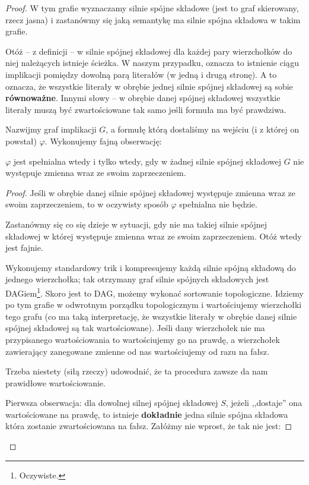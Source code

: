 \begin{proof}
	W tym grafie wyznaczamy silnie spójne składowe (jest to graf skierowany, rzecz jasna) i zastanówmy się jaką semantykę ma silnie spójna składowa w takim grafie.

	Otóż -- z definicji -- w silnie spójnej składowej dla każdej pary wierzchołków do niej należących istnieje ścieżka. W naszym przypadku, oznacza to istnienie ciągu implikacji pomiędzy dowolną parą literałów (w jedną i drugą stronę). A to oznacza, że wszystkie literały w obrębie jednej silnie spójnej składowej są sobie \textbf{równoważne}. Innymi słowy -- w obrębie danej spójnej składowej wszystkie literały muszą być zwartościowane tak samo jeśli formuła ma być prawdziwa.

	Nazwijmy graf implikacji \(G\), a formułę którą dostaliśmy na wejściu (i z której on powstał) \(\varphi\). Wykonujemy fajną obserwację:

	\begin{lemma}
		\(\varphi\) jest spełnialna wtedy i tylko wtedy, gdy w żadnej silnie spójnej składowej \(G\) nie występuje zmienna wraz ze swoim zaprzeczeniem.
	\end{lemma}
	\begin{proof}
		Jeśli w obrębie danej silnie spójnej składowej występuje zmienna wraz ze swoim zaprzeczeniem, to w oczywisty sposób \(\varphi\) spełnialna nie będzie.

		Zastanówmy się co się dzieje w sytuacji, gdy nie ma takiej silnie spójnej składowej w której występuje zmienna wraz ze swoim zaprzeczeniem. Otóż wtedy jest fajnie.

		Wykonujemy standardowy trik i kompresujemy każdą silnie spójną składową do jednego wierzchołka; tak otrzymany graf silnie spójnych składowych jest DAGiem\footnote{Oczywiste.}. Skoro jest to DAG, możemy wykonać sortowanie topologiczne. Idziemy po tym grafie w odwrotnym porządku topologicznym i wartościujemy wierzchołki tego grafu (co ma taką interpretację, że wszystkie literały w obrębie danej silnie spójnej składowej są tak wartościowane). Jeśli dany wierzchołek nie ma przypisanego wartościowania to wartościujemy go na prawdę, a wierzchołek zawierający zanegowane zmienne od nas wartościujemy od razu na fałsz.

		Trzeba niestety (siłą rzeczy) udowodnić, że ta procedura zawsze da nam prawidłowe wartościowanie.

		Pierwsza obserwacja: dla dowolnej silnej spójnej składowej \(S\), jeżeli ,,dostaje'' ona wartościowane na prawdę, to istnieje \textbf{dokładnie} jedna silnie spójna składowa która zostanie zwartościowana na fałsz. Załóżmy nie wprost, że tak nie jest:


\end{proof}
\end{proof}
